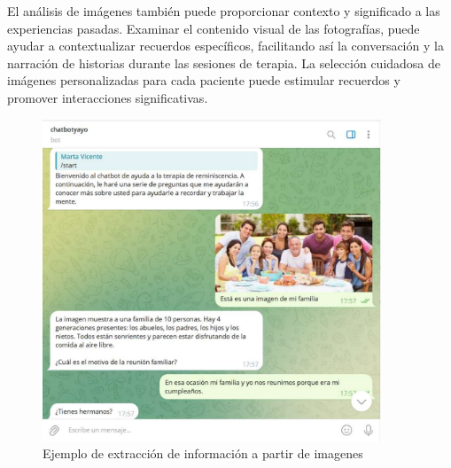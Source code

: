 El análisis de imágenes también puede proporcionar contexto y significado a las experiencias pasadas. Examinar el contenido visual de las fotografías, puede ayudar a contextualizar recuerdos específicos, facilitando así la conversación y la narración de historias durante las sesiones de terapia. La selección cuidadosa de imágenes personalizadas para cada paciente puede estimular recuerdos y promover interacciones significativas. 

\begin{figure}[h]
	\centering
	\includegraphics[width=0.9\textwidth]{Imagenes/extracInfoImag}
	\caption{Ejemplo de extracción de información a partir de imagenes}
\end{figure}
